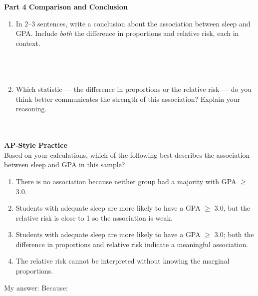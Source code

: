 \documentclass[10pt]{article}
\begin{document}
\vspace{0.22in}

{\large\bfseries\color{navy} Part 4 \quad Comparison and Conclusion}

\vspace{0.1in}

\begin{enumerate}[resume]

    \item In 2--3 sentences, write a conclusion about the association between sleep and GPA.
          Include \emph{both} the difference in proportions and relative risk, each in context.\\[8pt]
          \writeline\\[2pt]\writeline\\[2pt]\writeline\\[2pt]\writeline

    \vspace{0.1in}

    \item Which statistic --- the difference in proportions or the relative risk --- do you think
          better communicates the strength of this association? Explain your reasoning.\\[8pt]
          \writeline\\[2pt]\writeline\\[2pt]\writeline

\end{enumerate}

\vspace{0.18in}

\begin{tcolorbox}[colback=redbg, colframe=redacc, boxrule=0.8pt, arc=2mm,
    left=4mm, right=4mm, top=3mm, bottom=3mm]
\small\textbf{AP-Style Practice}\\[6pt]
Based on your calculations, which of the following best describes the association between
sleep and GPA in this sample?

\vspace{8pt}
\begin{enumerate}[label=\textbf{(\Alph*)}, leftmargin=2em, itemsep=6pt]
  \item There is no association because neither group had a majority with GPA $\geq$ 3.0.
  \item Students with adequate sleep are more likely to have a GPA $\geq$ 3.0, but the
        relative risk is close to 1 so the association is weak.
  \item Students with adequate sleep are more likely to have a GPA $\geq$ 3.0; both the
        difference in proportions and relative risk indicate a meaningful association.
  \item The relative risk cannot be interpreted without knowing the marginal proportions.
\end{enumerate}
\end{tcolorbox}

\vspace{0.1in}
\noindent\textcolor{slate}{\small My answer: \blank{1cm} \quad Because: \blank{8cm}}
\end{document}
